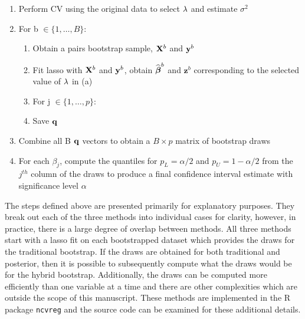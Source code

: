 \begin{enumerate}
\item Perform CV using the original data to select $\lambda$ and estimate $\sigma^2$
\item For b $\in \lbrace 1, \ldots, B \rbrace$:
\begin{enumerate}
\item Obtain a pairs bootstrap sample, $\mathbf{X}^b$ and $\mathbf{y}^b$
\item Fit lasso with $\mathbf{X}^b$ and $\mathbf{y}^b$, obtain $\widehat{\boldsymbol{\beta}}^b$ and $\boldsymbol{z}^b$ corresponding to the selected value of $\lambda$ in (a)
\item For j $\in \lbrace 1, \ldots, p \rbrace$:
	\begin{algorithmic}
    \EndCase
    \EndCase
    \EndCase
	\EndSwitch 
	\end{algorithmic}
\item Save $\mathbf{q}$
\end{enumerate}
\item Combine all B $\mathbf{q}$ vectors to obtain a $B \times p$ matrix of bootstrap draws
\item For each $\beta_j$, compute the quantiles for $p_L = \alpha/2$ and $p_U = 1 - \alpha/2$ from the $j^{th}$ column of the draws to produce a final confidence interval estimate with significance level $\alpha$
\end{enumerate}

 

The steps defined above are presented primarily for explanatory purposes. They break out each of the three methods into individual cases for clarity, however, in practice, there is a large degree of overlap between methods. All three methods start with a lasso fit on each bootstrapped dataset which provides the draws for the traditional bootstrap. If the draws are obtained for both traditional and posterior, then it is possible to subsequently compute what the draws would be for the hybrid bootstrap. Additionally, the draws can be computed more efficiently than one variable at a time and there are other complexities which are outside the scope of this manuscript. These methods are implemented in the R package \texttt{ncvreg} and the source code can be examined for these additional details.

